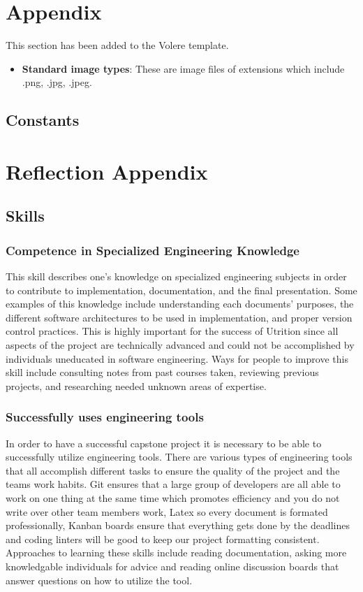 \documentclass[12pt]{article}
\begin{document}
{\section{Appendix}
This section has been added to the Volere template.
\begin{itemize}
	\item \textbf{Standard image types}: These are image files of extensions which include .png, .jpg, .jpeg.
\end{itemize}

\subsection{Constants}

\section{Reflection Appendix}
\subsection{Skills}
\subsubsection{Competence in Specialized Engineering Knowledge}
This skill describes one's knowledge on specialized engineering subjects in order to contribute to implementation, documentation, and the final presentation. Some examples of this knowledge include understanding each documents' purposes, the different software architectures to be used in implementation, and proper version control practices. This is highly important for the success of Utrition since all aspects of the project are technically advanced and could not be accomplished by individuals uneducated in software engineering. Ways for people to improve this skill include consulting notes from past courses taken, reviewing previous projects, and researching needed unknown areas of expertise.
\subsubsection{Successfully uses engineering tools}
In order to have a successful capstone project it is necessary to be able to successfully utilize engineering tools. There are various types of engineering tools that all accomplish different tasks to ensure the quality of the project and the teams work habits. Git ensures that a large group of developers are all able to work on one thing at the same time which promotes efficiency and you do not write over other team members work, Latex so every document is formated professionally, Kanban boards ensure that everything gets done by the deadlines and coding linters will be good to keep our project formatting consistent. Approaches to learning these skills include reading documentation, asking more knowledgable individuals for advice and reading online discussion boards that answer questions on how to utilize the tool. 

}
\end{document}
